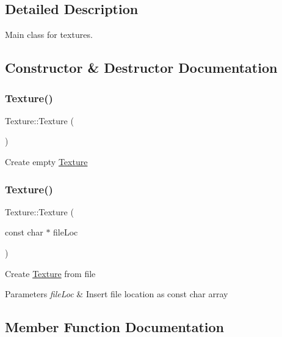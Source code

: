 \subsection{Detailed Description}
Main class for textures. 

\subsection{Constructor \& Destructor Documentation}
\mbox{\label{class_texture_a6c275e3f186675ff6ed73ccf970e552f}} 
\subsubsection{\texorpdfstring{Texture()}{Texture()}\hspace{0.1cm}{\footnotesize\ttfamily [1/2]}}
{\footnotesize\ttfamily Texture\+::\+Texture (\begin{DoxyParamCaption}{ }\end{DoxyParamCaption})}

Create empty \mbox{\hyperlink{class_texture}{Texture}} \mbox{\label{class_texture_a8c924539fdb5f0813de81ce1c68df578}} 
\subsubsection{\texorpdfstring{Texture()}{Texture()}\hspace{0.1cm}{\footnotesize\ttfamily [2/2]}}
{\footnotesize\ttfamily Texture\+::\+Texture (\begin{DoxyParamCaption}\item[{const char $\ast$}]{file\+Loc }\end{DoxyParamCaption})}

Create \mbox{\hyperlink{class_texture}{Texture}} from file 
\begin{DoxyParams}{Parameters}
{\em file\+Loc} & Insert file location as const char array \\
\hline
\end{DoxyParams}


\subsection{Member Function Documentation}
\mbox{\label{class_texture_a8993ef7966161dd2e61e62a593bcdc80}} 

